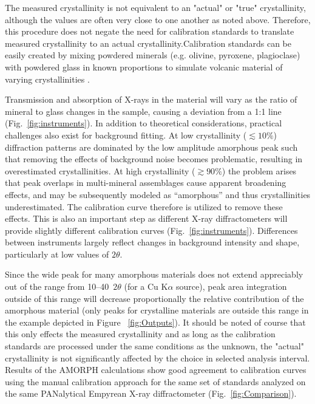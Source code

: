 \documentclass[review]{elsarticle}
\begin{document}
The measured crystallinity is not equivalent to an "actual" or "true" crystallinity, although the values are often very close to one another as noted above.
Therefore, this procedure does not negate the need for calibration standards
to translate measured crystallinity to an actual crystallinity.Calibration standards can be easily created by mixing
powdered minerals (e.g. olivine, pyroxene, plagioclase) with powdered glass in known
proportions to simulate volcanic material of varying crystallinities \citep[e.g.,][]{rowe2012, wall2014}. 

Transmission and absorption of X-rays in the material will vary as the ratio of mineral to glass changes in the sample, causing a deviation from a 1:1 line (Fig.~\ref{fig:instruments}). In addition to theoretical considerations, practical challenges also exist for background fitting. At low crystallinity ($\lesssim 10\%$) diffraction patterns are dominated by the low amplitude amorphous peak such that removing the effects of background noise becomes problematic, resulting in overestimated crystallinities. At high crystallinity ($\gtrsim 90\%$) the problem arises that peak overlaps in multi-mineral assemblages cause apparent broadening effects, and may be subsequently modeled as ``amorphous'' and thus crystallinities  underestimated. The calibration curve therefore is utilized to remove these effects. This is also an important step as
different X-ray diffractometers will provide slightly different calibration curves (Fig.~\ref{fig:instruments}).
Differences between instruments largely reflect changes in background intensity and shape,
particularly at low values of $2\theta$. 

	
Since the wide peak for many amorphous materials does not extend
appreciably out of the range from 10--40\degree~$2\theta$ (for a Cu K$\alpha$ source), peak area integration
outside of this range will decrease proportionally the relative contribution of the amorphous material
(only peaks for crystalline materials are outside this range in the example depicted in Figure ~\ref{fig:Outputs}). It should be noted of course that this only effects the measured crystallinity and as long as the calibration standards are processed under the same conditions as the unknown, the "actual" crystallinity is not significantly affected by the choice in selected analysis interval. Results of the AMORPH calculations show good agreement to calibration curves using the manual
calibration approach for the same set of standards analyzed on the same PANalytical Empyrean X-ray diffractometer (Fig.~\ref{fig:Comparison}). 
\end{document}
